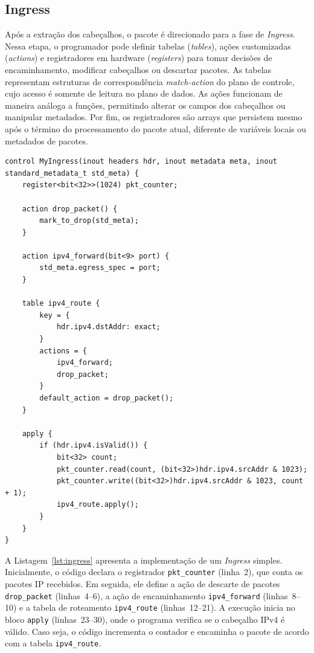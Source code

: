 \documentclass[12pt]{article}
\begin{document}
\subsection{Ingress}
\label{sec:p4:ingress}

Após a extração dos cabeçalhos, o pacote é direcionado para a fase de \textit{Ingress}.
Nessa etapa, o programador pode definir tabelas (\textit{tables}),
ações customizadas (\textit{actions}) e registradores em hardware (\textit{registers})
para tomar decisões de encaminhamento, modificar cabeçalhos ou descartar pacotes.
As tabelas representam estruturas de correspondência \textit{match-action} do plano de controle,
cujo acesso é somente de leitura no plano de dados.
As ações funcionam de maneira análoga a funções, permitindo alterar os campos dos cabeçalhos ou manipular metadados.
Por fim, os registradores são arrays que persistem mesmo após o término do processamento do pacote atual,
diferente de variáveis locais ou metadados de pacotes.

\begin{lstlisting}[language=P4, caption={Exemplo simplificado de Ingress Processing em P4.}, label={lst:ingress}]
control MyIngress(inout headers hdr, inout metadata meta, inout standard_metadata_t std_meta) {
    register<bit<32>>(1024) pkt_counter;

    action drop_packet() {
        mark_to_drop(std_meta);
    }

    action ipv4_forward(bit<9> port) {
        std_meta.egress_spec = port;
    }

    table ipv4_route {
        key = {
            hdr.ipv4.dstAddr: exact;
        }
        actions = {
            ipv4_forward;
            drop_packet;
        }
        default_action = drop_packet();
    }

    apply {
        if (hdr.ipv4.isValid()) {
            bit<32> count;
            pkt_counter.read(count, (bit<32>)hdr.ipv4.srcAddr & 1023);
            pkt_counter.write((bit<32>)hdr.ipv4.srcAddr & 1023, count + 1);
            ipv4_route.apply();
        }
    }
}
\end{lstlisting}

A Listagem~\ref{lst:ingress} apresenta a implementação de um \textit{Ingress} simples.
Inicialmente, o código declara o registrador \texttt{pkt\_counter} (linha~2), que conta os pacotes IP recebidos.
Em seguida, ele define a ação de descarte de pacotes \texttt{drop\_packet} (linhas~4--6),
a ação de encaminhamento \texttt{ipv4\_forward} (linhas~8--10) e a tabela de roteamento \texttt{ipv4\_route} (linhas~12--21).
A execução inicia no bloco \texttt{apply} (linhas~23--30), onde o programa verifica se o cabeçalho IPv4 é válido.
Caso seja, o código incrementa o contador e encaminha o pacote de acordo com a tabela \texttt{ipv4\_route}.
\end{document}
